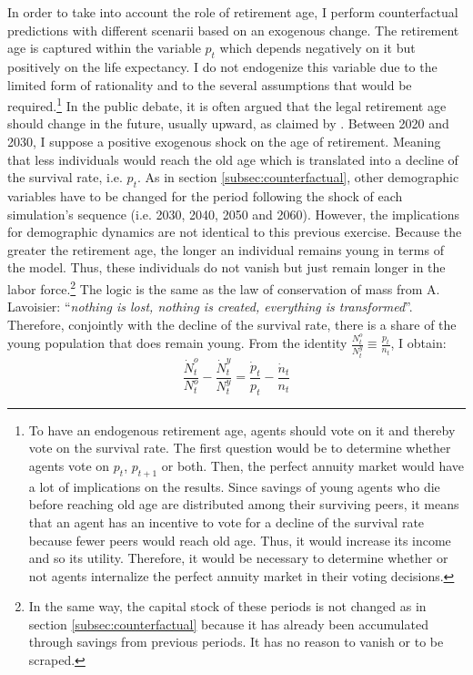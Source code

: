 In order to take into account the role of retirement age, I perform counterfactual predictions with different scenarii based on an exogenous change. The retirement age is captured within the variable $p_t$ which depends negatively on it but positively on the life expectancy. I do not endogenize this variable due to the limited form of rationality and to the several assumptions that would be required.\footnote{To have an endogenous retirement age, agents should vote on it and thereby vote on the survival rate. The first question would be to determine whether agents vote on $p_t$, $p_{t+1}$ or both. Then, the perfect annuity market would have a lot of implications on the results. Since savings of young agents who die before reaching old age are distributed among their surviving peers, it means that an agent has an incentive to vote for a decline of the survival rate because fewer peers would reach old age. Thus, it would increase its income and so its utility. Therefore, it would be necessary to determine whether or not agents internalize the perfect annuity market in their voting decisions.} In the public debate, it is often argued that the legal retirement age should change in the future, usually upward, as claimed by \cite{Gonzalez-Eiras2012}%
. Between 2020 and 2030, I suppose a positive exogenous shock on the age of retirement. Meaning that less individuals would reach the old age which is translated into a decline of the survival rate, i.e. $p_t$. As in section \ref{subsec:counterfactual}, other demographic variables have to be changed for the period following the shock of each simulation's sequence (i.e. 2030, 2040, 2050 and 2060). However, the implications for demographic dynamics are not identical to this previous exercise. Because the greater the retirement age, the longer an individual remains young in terms of the model. Thus, these individuals do not vanish but just remain longer in the labor force.\footnote{In the same way, the capital stock of these periods is not changed as in section \ref{subsec:counterfactual} because it has already been accumulated through savings from previous periods. It has no reason to vanish or to be scraped.}
The logic is the same as the law of conservation of mass from A. Lavoisier: ``\textit{nothing is lost, nothing is created, everything is transformed}''.
Therefore, conjointly with the decline of the survival rate, there is a share of the young population that does remain young.
From the identity $\frac{N_t^o}{N_t^y} \equiv \frac{p_t}{n_t}$, I obtain:
\begin{equation} \label{eq:demo_growth_identity}
	\frac{\dot{N}_t^o}{N_t^o} - \frac{\dot{N}_t^y}{N_t^y} = \frac{\dot{p}_t}{p_t} - \frac{\dot{n}_t}{n_t}
\end{equation}
